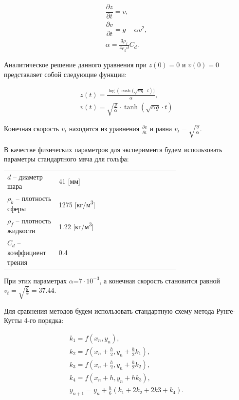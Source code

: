 \documentclass[master, och, diploma, times]{sty/SCWorks}
\theoremstyle{plain}
\theoremstyle{definition}
\numberwithin{equation}{section}
\begin{document}
\begin{equation}
\begin{aligned}
\dfrac{\partial z}{ \partial t} = v, \\
\dfrac{\partial v}{ \partial t} = g - \alpha v^2, \\
\alpha = \frac{3\rho_f}{4\rho_k d}C_d.
\end{aligned}
\end{equation}

\noindent Аналитическое решение данного уравнения при $z(0)=0$ и $v(0)=0$ представляет собой следующие функции:

\begin{equation}
\begin{aligned}
z(t)=\frac{\log{(\cosh{(\sqrt{\alpha g} \cdot t})})}{\alpha}, \\
v(t)=\sqrt{\frac{g}{\alpha}} \cdot \tanh{(\sqrt{\alpha g} \cdot t)}
\end{aligned}
\end{equation}

\noindent Конечная скорость $v_t$ находится из уравнения $\frac{\partial v}{ \partial t}$ и равна $v_t=\sqrt{\frac{g}{\alpha}}$.

В качестве физических параметров для эксперимента будем использовать параметры стандартного мяча для гольфа:

\begin{threeparttable}
\begin{longtable}[H]{lp{0.7\linewidth}}
{$d$} -- диаметр шара & 41 [мм] \\
{$\rho_k$} -- плотность сферы & 1275 [кг/м\textsuperscript{3}] \\
{$\rho_f$} -- плотность жидкости & 1.22 [кг/м\textsuperscript{3}] \\
{$C_d$} -- коэффициент трения & 0.4 
\end{longtable} 
\end{threeparttable}


При этих параметрах $\alpha$=$7 \cdot 10^{-3}$, а конечная скорость становится равной $v_t=\sqrt{\frac{g}{\alpha}}=37.44$.

Для сравнения методов будем использовать стандартную схему метода Рунге-Кутты 4-го порядка:

\begin{equation}%
\begin{aligned}
k_1 = f(x_n, y_n), \\
k_2 = f(x_n+\frac{h}{2}, y_n+\frac{h}{2}k_1), \\
k_3 = f(x_n+\frac{h}{2}, y_n+\frac{h}{2}k_2), \\ 
k_4 = f(x_n+h, y_n+hk_3), \\
y_{n+1}=y_n+\frac{h}{6}(k_1+2k_2+2k3+k_4).
\end{aligned}
\end{equation}
\end{document}
